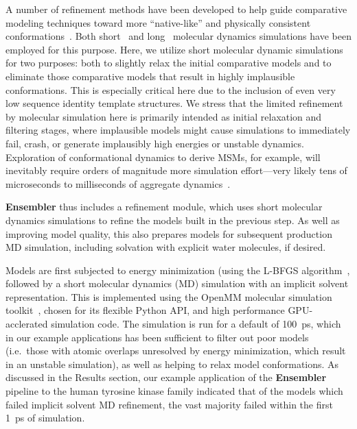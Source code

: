 \documentclass[10pt,letterpaper]{article}
\begin{document}
A number of refinement methods have been developed to help guide comparative modeling techniques toward more ``native-like'' and physically consistent conformations~\cite{maccallum:prot:2011:casp-refinement,zhang:curr-opin-struct-biol:2009:structure-prediction}.
Both short~\cite{zhang:curr-opin-struct-biol:2009:structure-prediction} and long~\cite{raval:prot:2012:long-timescale-md-refinement} molecular dynamics simulations have been employed for this purpose.
Here, we utilize short molecular dynamic simulations for two purposes: both to slightly relax the initial comparative models and to eliminate those comparative models that result in highly implausible conformations.
This is especially critical here due to the inclusion of even very low sequence identity template structures.
We stress that the limited refinement by molecular simulation here is primarily intended as initial relaxation and filtering stages, where implausible models might cause simulations to immediately fail, crash, or generate implausibly high energies or unstable dynamics.
Exploration of conformational dynamics to derive MSMs, for example, will inevitably require orders of magnitude more simulation effort---very likely tens of microseconds to milliseconds of aggregate dynamics~\cite{pande-beauchamp-bowman:2010:methods:markov-model-review,chodera-noe:curr-opin-struct-biol:2014:msm-review}.

{\bf Ensembler} thus includes a refinement module, which uses short molecular dynamics simulations to refine the models built in the previous step.
As well as improving model quality, this also prepares models for subsequent production MD simulation, including solvation with explicit water molecules, if desired.

Models are first subjected to energy minimization (using the L-BFGS algorithm~\cite{lbfgs}, followed by a short molecular dynamics (MD) simulation with an implicit solvent representation.
This is implemented using the OpenMM molecular simulation toolkit~\cite{eastman:jctc:2012:openmm}, chosen for its flexible Python API, and high performance GPU-acclerated simulation code.
The simulation is run for a default of 100~ps, which in our example applications has been sufficient to filter out poor models (i.e.~those with atomic overlaps unresolved by energy minimization, which result in an unstable simulation), as well as helping to relax model conformations.
As discussed in the Results section, our example application of the {\bf Ensembler} pipeline to the human tyrosine kinase family indicated that of the models which failed implicit solvent MD refinement, the vast majority failed within the first 1~ps of simulation.
\end{document}
